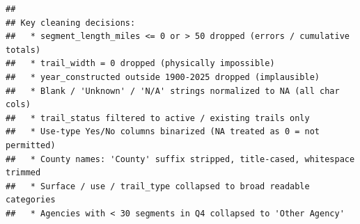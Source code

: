 \documentclass[
]{article}
\begin{document}
\begin{verbatim}
## 
## Key cleaning decisions:
##   * segment_length_miles <= 0 or > 50 dropped (errors / cumulative totals)
##   * trail_width = 0 dropped (physically impossible)
##   * year_constructed outside 1900-2025 dropped (implausible)
##   * Blank / 'Unknown' / 'N/A' strings normalized to NA (all char cols)
##   * trail_status filtered to active / existing trails only
##   * Use-type Yes/No columns binarized (NA treated as 0 = not permitted)
##   * County names: 'County' suffix stripped, title-cased, whitespace trimmed
##   * Surface / use / trail_type collapsed to broad readable categories
##   * Agencies with < 30 segments in Q4 collapsed to 'Other Agency'
\end{verbatim}
\end{document}
